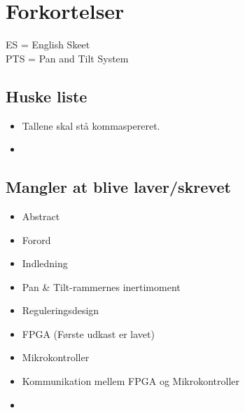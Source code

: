 \section*{Forkortelser}

ES = English Skeet \\
PTS = Pan and Tilt System

\subsection*{Huske liste}
\begin{itemize}
\item Tallene skal stå kommaspereret.
\item {}
\end{itemize}



\subsection*{Mangler at blive laver/skrevet}
\begin{itemize}
\item Abstract
\item Forord
\item Indledning
\item Pan \& Tilt-rammernes inertimoment
\item Reguleringsdesign
\item FPGA (Første udkast er lavet)
\item Mikrokontroller
\item Kommunikation mellem FPGA og Mikrokontroller
\item 
\listoftodos

\end{itemize}